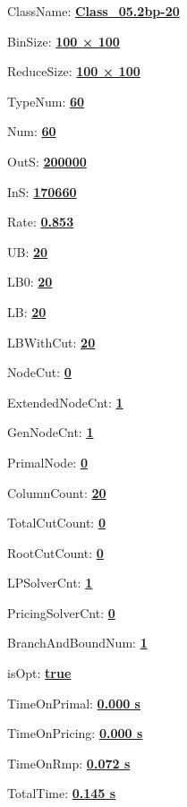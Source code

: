 \documentclass[11pt]{article}
\begin{document}
\pagestyle{empty}


ClassName: \underline{\textbf{Class_05.2bp-20}}
\par
BinSize: \underline{\textbf{100 × 100}}
\par
ReduceSize: \underline{\textbf{100 × 100}}
\par
TypeNum: \underline{\textbf{60}}
\par
Num: \underline{\textbf{60}}
\par
OutS: \underline{\textbf{200000}}
\par
InS: \underline{\textbf{170660}}
\par
Rate: \underline{\textbf{0.853}}
\par
UB: \underline{\textbf{20}}
\par
LB0: \underline{\textbf{20}}
\par
LB: \underline{\textbf{20}}
\par
LBWithCut: \underline{\textbf{20}}
\par
NodeCut: \underline{\textbf{0}}
\par
ExtendedNodeCnt: \underline{\textbf{1}}
\par
GenNodeCnt: \underline{\textbf{1}}
\par
PrimalNode: \underline{\textbf{0}}
\par
ColumnCount: \underline{\textbf{20}}
\par
TotalCutCount: \underline{\textbf{0}}
\par
RootCutCount: \underline{\textbf{0}}
\par
LPSolverCnt: \underline{\textbf{1}}
\par
PricingSolverCnt: \underline{\textbf{0}}
\par
BranchAndBoundNum: \underline{\textbf{1}}
\par
isOpt: \underline{\textbf{true}}
\par
TimeOnPrimal: \underline{\textbf{0.000 s}}
\par
TimeOnPricing: \underline{\textbf{0.000 s}}
\par
TimeOnRmp: \underline{\textbf{0.072 s}}
\par
TotalTime: \underline{\textbf{0.145 s}}
\par
\newpage


\end{document}
